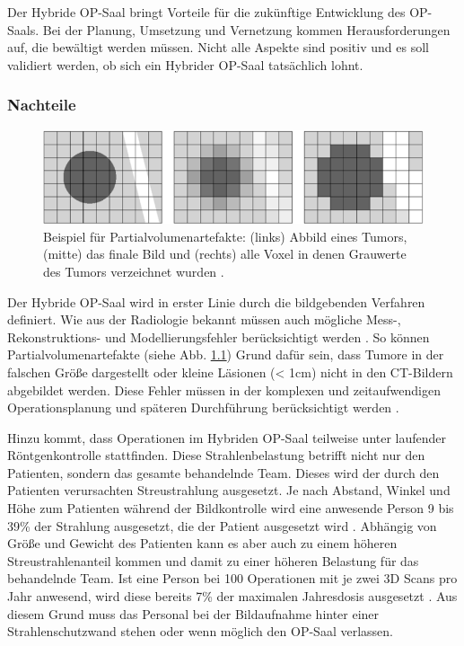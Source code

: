 \chapter{}
\label{sec:overview}

Der Hybride OP-Saal bringt Vorteile für die zukünftige Entwicklung des OP-Saals. Bei der Planung, Umsetzung und Vernetzung kommen Herausforderungen auf, die bewältigt werden müssen. Nicht alle Aspekte sind positiv und es soll validiert werden, ob sich ein Hybrider OP-Saal tatsächlich lohnt.

\subsection{Nachteile}

\begin{figure} [H]
	\includegraphics[scale = 0.7]{Content/Pictures/partial.png}
	\caption{Beispiel für Partialvolumenartefakte: (links) Abbild eines Tumors, (mitte) das finale Bild und (rechts) alle Voxel in denen Grauwerte des Tumors verzeichnet wurden \cite{DerDigitaleOperationssaal}.}
	\label{fig:partial}
\end{figure}

Der Hybride OP-Saal wird in erster Linie durch die bildgebenden Verfahren definiert. Wie aus der Radiologie bekannt müssen auch mögliche \glqq Mess-, Rekonstruktions- und Modellierungsfehler berücksichtigt werden\grqq{} \cite{DerDigitaleOperationssaal}. So können Partialvolumenartefakte (siehe Abb. \ref{fig:partial}) Grund dafür sein, dass Tumore in der falschen Größe dargestellt oder kleine Läsionen (< 1cm) nicht in den CT-Bildern abgebildet werden. Diese Fehler müssen in der komplexen und zeitaufwendigen Operationsplanung und späteren Durchführung berücksichtigt werden \cite{DerDigitaleOperationssaal}.

Hinzu kommt, dass Operationen im Hybriden OP-Saal teilweise unter laufender Röntgenkontrolle stattfinden. Diese Strahlenbelastung betrifft nicht nur den Patienten, sondern das gesamte behandelnde Team. Dieses wird der durch den Patienten verursachten Streustrahlung ausgesetzt. Je nach Abstand, Winkel und Höhe zum Patienten während der Bildkontrolle wird eine anwesende Person 9 bis 39\% der Strahlung ausgesetzt, die der Patient ausgesetzt wird \cite{RadiationExposure}. Abhängig von Größe und Gewicht des Patienten kann es aber auch zu einem höheren Streustrahlenanteil kommen und damit zu einer höheren Belastung für das behandelnde Team. Ist eine Person bei 100 Operationen mit je zwei 3D Scans pro Jahr anwesend, wird diese bereits 7\% der maximalen Jahresdosis ausgesetzt \cite{RadiationExposure}. Aus diesem Grund muss das Personal bei der Bildaufnahme hinter einer Strahlenschutzwand stehen oder wenn möglich den OP-Saal verlassen.

